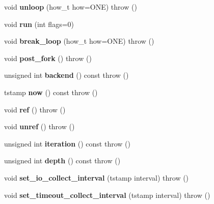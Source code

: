 \begin{DoxyCompactItemize}
void {\bfseries unloop} (how\+\_\+t how=O\+NE)  throw ()
\item 
\hypertarget{structev_1_1loop__ref_a895c5422c6012224bd99ab30ae13caa6}{}\label{structev_1_1loop__ref_a895c5422c6012224bd99ab30ae13caa6} 
void {\bfseries run} (int flags=0)
\item 
\hypertarget{structev_1_1loop__ref_a579d5108904f34c7faac0b41336dfcf3}{}\label{structev_1_1loop__ref_a579d5108904f34c7faac0b41336dfcf3} 
void {\bfseries break\+\_\+loop} (how\+\_\+t how=O\+NE)  throw ()
\item 
\hypertarget{structev_1_1loop__ref_aa46f607fc2bf3ac6834b8b2df9596398}{}\label{structev_1_1loop__ref_aa46f607fc2bf3ac6834b8b2df9596398} 
void {\bfseries post\+\_\+fork} ()  throw ()
\item 
\hypertarget{structev_1_1loop__ref_a1e18db43676887445aeb97748c7f4082}{}\label{structev_1_1loop__ref_a1e18db43676887445aeb97748c7f4082} 
unsigned int {\bfseries backend} () const  throw ()
\item 
\hypertarget{structev_1_1loop__ref_afecb6dbce9db53575e7a3a8fb8fcf9a6}{}\label{structev_1_1loop__ref_afecb6dbce9db53575e7a3a8fb8fcf9a6} 
tstamp {\bfseries now} () const  throw ()
\item 
\hypertarget{structev_1_1loop__ref_a09bebb58fbbcf040b519d664add29722}{}\label{structev_1_1loop__ref_a09bebb58fbbcf040b519d664add29722} 
void {\bfseries ref} ()  throw ()
\item 
\hypertarget{structev_1_1loop__ref_ab1dddfeae1c8fcdded9dd08afff3940d}{}\label{structev_1_1loop__ref_ab1dddfeae1c8fcdded9dd08afff3940d} 
void {\bfseries unref} ()  throw ()
\item 
\hypertarget{structev_1_1loop__ref_a8aba353209992f883e7fe83c718a557c}{}\label{structev_1_1loop__ref_a8aba353209992f883e7fe83c718a557c} 
unsigned int {\bfseries iteration} () const  throw ()
\item 
\hypertarget{structev_1_1loop__ref_aa53dd1b61f1ee44058a10a590ce4f982}{}\label{structev_1_1loop__ref_aa53dd1b61f1ee44058a10a590ce4f982} 
unsigned int {\bfseries depth} () const  throw ()
\item 
\hypertarget{structev_1_1loop__ref_a6b085b1d677aaedc5bfab9e19682191a}{}\label{structev_1_1loop__ref_a6b085b1d677aaedc5bfab9e19682191a} 
void {\bfseries set\+\_\+io\+\_\+collect\+\_\+interval} (tstamp interval)  throw ()
\item 
\hypertarget{structev_1_1loop__ref_a29069e561a298346dbcabc0a6a35ed66}{}\label{structev_1_1loop__ref_a29069e561a298346dbcabc0a6a35ed66} 
void {\bfseries set\+\_\+timeout\+\_\+collect\+\_\+interval} (tstamp interval)  throw ()

\end{DoxyCompactItemize}
